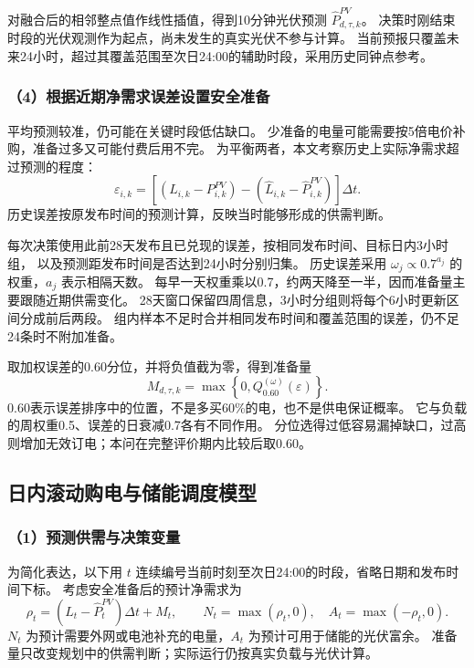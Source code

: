 对融合后的相邻整点值作线性插值，得到10分钟光伏预测 $\widehat P^{PV}_{d,\tau,k}$。
决策时刚结束时段的光伏观测作为起点，尚未发生的真实光伏不参与计算。
当前预报只覆盖未来24小时，超过其覆盖范围至次日24:00的辅助时段，采用历史同钟点参考。

\subsubsection*{（4）根据近期净需求误差设置安全准备}

平均预测较准，仍可能在关键时段低估缺口。
少准备的电量可能需要按5倍电价补购，准备过多又可能付费后用不完。
为平衡两者，本文考察历史上实际净需求超过预测的程度：
\begin{equation}
\varepsilon_{i,k}
=\left[(L_{i,k}-P^{PV}_{i,k})
-(\widehat L_{i,k}-\widehat P^{PV}_{i,k})\right]\Delta t.
\end{equation}
历史误差按原发布时间的预测计算，反映当时能够形成的供需判断。

每次决策使用此前28天发布且已兑现的误差，按相同发布时间、目标日内3小时组，
以及预测距发布时间是否达到24小时分别归集。
历史误差采用 $\omega_j\propto0.7^{a_j}$ 的权重，$a_j$ 表示相隔天数。
每早一天权重乘以0.7，约两天降至一半，因而准备量主要跟随近期供需变化。
28天窗口保留四周信息，3小时分组则将每个6小时更新区间分成前后两段。
组内样本不足时合并相同发布时间和覆盖范围的误差，仍不足24条时不附加准备。

取加权误差的0.60分位，并将负值截为零，得到准备量
\begin{equation}
M_{d,\tau,k}=\max\left\{0,Q_{0.60}^{(\omega)}(\varepsilon)\right\}.
\end{equation}
0.60表示误差排序中的位置，不是多买60\%的电，也不是供电保证概率。
它与负载的周权重0.5、误差的日衰减0.7各有不同作用。
分位选得过低容易漏掉缺口，过高则增加无效订电；本问在完整评价期内比较后取0.60。

\subsection{日内滚动购电与储能调度模型}

\subsubsection*{（1）预测供需与决策变量}

为简化表达，以下用 $t$ 连续编号当前时刻至次日24:00的时段，省略日期和发布时间下标。
考虑安全准备后的预计净需求为
\begin{equation}
\rho_t=(\widehat L_t-\widehat P^{PV}_t)\Delta t+M_t,\qquad
N_t=\max(\rho_t,0),\quad A_t=\max(-\rho_t,0).
\end{equation}
$N_t$ 为预计需要外网或电池补充的电量，$A_t$ 为预计可用于储能的光伏富余。
准备量只改变规划中的供需判断；实际运行仍按真实负载与光伏计算。

